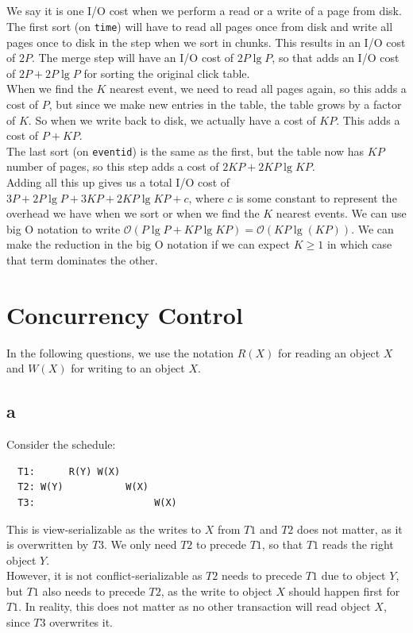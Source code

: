 \documentclass[a4paper]{article}
\begin{document}
\subsection{}
We say it is one I/O cost when we perform a read or a write of a page from disk. The first sort (on \texttt{time}) will have to read all pages once from disk and write all pages once to disk in the step when we sort in chunks. This results in an I/O cost of $2P$. The merge step will have an I/O cost of $2P\lg P$, so that adds an I/O cost of $2P+2P\lg P$ for sorting the original click table. \\
When we find the $K$ nearest event, we need to read all pages again, so this adds a cost of $P$, but since we make new entries in the table, the table grows by a factor of $K$. So when we write back to disk, we actually have a cost of $KP$. This adds a cost of $P+KP$. \\
The last sort (on \texttt{eventid}) is the same as the first, but the table now has $KP$ number of pages, so this step adds a cost of $2KP+2KP\lg KP$. \\
Adding all this up gives us a total I/O cost of $3P+2P\lg P+3KP+2KP\lg KP + c$, where $c$ is some constant to represent the overhead we have when we sort or when we find the $K$ nearest events. We can use big O notation to write $\mathcal{O}(P\lg P+KP\lg KP)=\mathcal{O}(KP\lg( KP))$. We can make the reduction in the big O notation if we can expect $K\geq 1$ in which case that term dominates the other.

\section{Concurrency Control}
In the following questions, we use the notation $R(X)$ for reading an object $X$ and $W(X)$ for writing to an object $X$.

\subsection{a}
Consider the schedule:
\begin{verbatim}
  T1:      R(Y) W(X)
  T2: W(Y)           W(X)
  T3:                     W(X)
\end{verbatim}
This is view-serializable as the writes to $X$ from $T1$ and $T2$ does not matter, as it is overwritten by $T3$. We only need $T2$ to precede $T1$, so that $T1$ reads the right object $Y$. \\
However, it is not conflict-serializable as $T2$ needs to precede $T1$ due to object $Y$, but $T1$ also needs to precede $T2$, as the write to object $X$ should happen first for $T1$. In reality, this does not matter as no other transaction will read object $X$, since $T3$ overwrites it.
\end{document}
